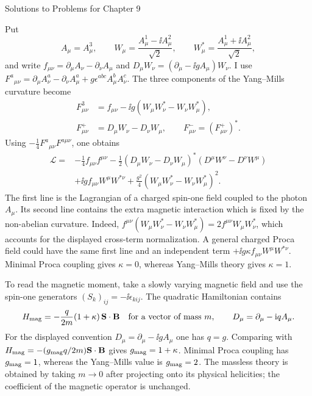 \begin{bankssolutions}{Solutions to Problems for Chapter 9}

Put
\[
 A_\mu=A^3_\mu,
 \qquad W_\mu=\frac{A^1_\mu-\ii A^2_\mu}{\sqrt2},
 \qquad W_\mu^*=\frac{A^1_\mu+\ii A^2_\mu}{\sqrt2},
\]
and write $f_{\mu\nu}=\partial_\mu A_\nu-\partial_\nu A_\mu$ and
$D_\mu W_\nu=(\partial_\mu-\ii gA_\mu)W_\nu$.  I use
$F^a{}_{\mu\nu}=\partial_\mu A^a_\nu-\partial_\nu A^a_\mu
+g\epsilon^{abc}A^b_\mu A^c_\nu$.  The three components of the
Yang--Mills curvature become
\begin{align*}
 F^3_{\mu\nu}&=f_{\mu\nu}-\ii g
 (W_\mu W_\nu^*-W_\nu W_\mu^*),\\
 F^+_{\mu\nu}&=D_\mu W_\nu-D_\nu W_\mu,
 \qquad F^-_{\mu\nu}=(F^+_{\mu\nu})^* .
\end{align*}
Using $-\frac14F^a{}_{\mu\nu}F^{a\mu\nu}$, one obtains
\begin{align*}
 \mathcal L={}&-\frac14 f_{\mu\nu}f^{\mu\nu}
 -\frac12(D_\mu W_\nu-D_\nu W_\mu)^*
              (D^\mu W^\nu-D^\nu W^\mu)\\
 &+\ii g f_{\mu\nu}W^\mu W^{*\nu}
 +\frac{g^2}{4}(W_\mu W_\nu^*-W_\nu W_\mu^*)^2 .
\end{align*}
The first line is the Lagrangian of a charged spin-one field coupled to the
photon $A_\mu$.  Its second line contains the extra magnetic interaction
 which is fixed by the non-abelian curvature.  Indeed,
 $f^{\mu\nu}(W_{\mu}W^*_{\nu}-W_{\nu}W^*_{\mu})
 =2f^{\mu\nu}W_{\mu}W^*_{\nu}$, which accounts for the displayed
 cross-term normalization.  A general charged Proca field could have the
 same first line and an independent term
 $+\ii g\kappa f_{\mu\nu}W^\mu W^{*\nu}$.  Minimal Proca coupling gives
$\kappa=0$, whereas Yang--Mills theory gives $\kappa=1$.

To read the magnetic moment, take a slowly varying magnetic field and use
the spin-one generators $(S_k)_{ij}=-\ii\epsilon_{kij}$.  The quadratic
Hamiltonian contains
\[
 H_{\rm mag}=-\frac{q}{2m}(1+\kappa)\,
 \mathbf S\mathbin{\cdot}\mathbf B
 \quad\text{for a vector of mass }m,
 \qquad D_\mu=\partial_\mu-\mathrm{i} qA_\mu .
 \]
For the displayed convention $D_\mu=\partial_\mu-\ii gA_\mu$ one has
$q=g$.  Comparing with
$H_{\rm mag}=-(g_{\rm mag}q/2m)\mathbf S\cdot\mathbf B$ gives
$g_{\rm mag}=1+\kappa$.  Minimal Proca coupling has $g_{\rm mag}=1$,
whereas the Yang--Mills value is $g_{\rm mag}=2$.  The massless theory is
obtained by taking $m\to0$ after
projecting onto its physical helicities; the coefficient of the magnetic
operator is unchanged.


\end{bankssolutions}
